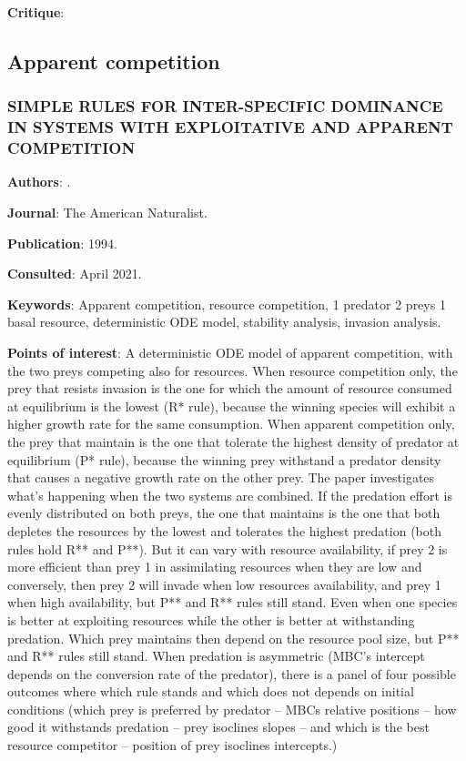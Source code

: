 \documentclass[12pt,a4paper]{article}
\begin{document}
\textbf{Critique}:

\newpage

\subsection*{Apparent competition}

\subsubsection*{SIMPLE RULES FOR INTER-SPECIFIC DOMINANCE IN SYSTEMS WITH EXPLOITATIVE AND APPARENT COMPETITION}

\textbf{Authors}: \cite{holt1994simple}.

\textbf{Journal}: The American Naturalist.

\textbf{Publication}: 1994.

\textbf{Consulted}: April 2021.

\textbf{Keywords}: Apparent competition, resource competition, 1 predator 2 preys 1 basal resource, deterministic ODE model, stability analysis, invasion analysis.

\textbf{Points of interest}: A deterministic ODE model of apparent competition, with the two preys competing also for resources. When resource competition only, the prey that resists invasion is the one for which the amount of resource consumed at equilibrium is the lowest (R* rule), because the winning species will exhibit a higher growth rate for the same consumption. When apparent competition only, the prey that maintain is the one that tolerate the highest density of predator at equilibrium (P* rule), because the winning prey withstand a predator density that causes a negative growth rate on the other prey. The paper investigates what's happening when the two systems are combined. If the predation effort is evenly distributed on both preys, the one that maintains is the one that both depletes the resources by the lowest and tolerates the highest predation (both rules hold R** and P**). But it can vary with resource availability, if prey 2 is more efficient than prey 1 in assimilating resources when they are low and conversely, then prey 2 will invade when low resources availability, and prey 1 when high availability, but P** and R** rules still stand. Even when one species is better at exploiting resources while the other is better at withstanding predation. Which prey maintains then depend on the resource pool size, but P** and R** rules still stand. When predation is asymmetric (MBC's intercept depends on the conversion rate of the predator), there is a panel of four possible outcomes where which rule stands and which does not depends on initial conditions (which prey is preferred by predator -- MBCs relative positions -- how good it withstands predation -- prey isoclines slopes -- and which is the best resource competitor -- position of prey isoclines intercepts.)
\end{document}
